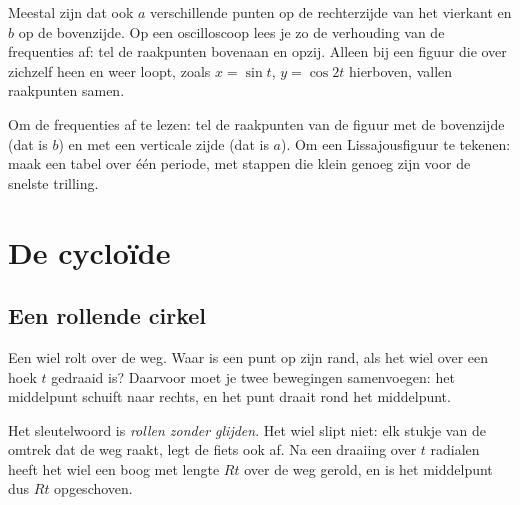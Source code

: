 Meestal zijn dat ook $a$ verschillende punten op de rechterzijde van het vierkant en $b$ op de bovenzijde. Op een oscilloscoop lees je zo de verhouding van de frequenties af: tel de raakpunten bovenaan en opzij. Alleen bij een figuur die over zichzelf heen en weer loopt, zoals $x = \sin t$, $y = \cos 2t$ hierboven, vallen raakpunten samen.

\begin{werkwijze}
Om de frequenties af te lezen: tel de raakpunten van de figuur met de bovenzijde (dat is $b$) en met een verticale zijde (dat is $a$). Om een Lissajousfiguur te tekenen: maak een tabel over één periode, met stappen die klein genoeg zijn voor de snelste trilling.
\end{werkwijze}


\begin{oefeningen}
\end{oefeningen}

\section{De cycloïde}

\subsection{Een rollende cirkel}

Een wiel rolt over de weg. Waar is een punt op zijn rand, als het wiel over een hoek $t$ gedraaid is? Daarvoor moet je twee bewegingen samenvoegen: het middelpunt schuift naar rechts, en het punt draait rond het middelpunt.

Het sleutelwoord is \textit{rollen zonder glijden}. Het wiel slipt niet: elk stukje van de omtrek dat de weg raakt, legt de fiets ook af. Na een draaiing over $t$ radialen heeft het wiel een boog met lengte $Rt$ over de weg gerold, en is het middelpunt dus $Rt$ opgeschoven.

